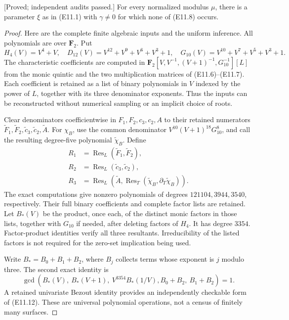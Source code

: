 \begin{lemma}
\label{lem:uniform-eleven-good-parameters-candidate}
\textup{[Proved; independent audits passed.]}
For every normalized modulus $\mu$, there is a parameter $\xi$ as
in (E11.1) with $\gamma\ne0$ for which none of (E11.8) occurs.
\end{lemma}
\begin{proof}
Here are the complete finite algebraic inputs and the uniform inference.
All polynomials are over $\mathbf F_2$. Put
\[
 H_4(V)=V^4+V,\quad D_{12}(V)=V^{12}+V^9+V^6+V^3+1,
 \quad G_{10}(V)=V^{10}+V^7+V^5+V^3+1.
\]
The characteristic coefficients are computed in
$\mathbf F_2[V,V^{-1},(V+1)^{-1},G_{10}^{-1}][L]$ from the monic
quintic and the two multiplication matrices of (E11.6)--(E11.7).
Each coefficient is retained as a list of binary polynomials in $V$
indexed by the power of $L$, together with its three denominator
exponents. Thus the inputs can be reconstructed without numerical
sampling or an implicit choice of roots.

Clear denominators coefficientwise in $F_1,F_2,c_3,c_2,A$ to their
retained numerators $\widetilde F_1,\widetilde F_2,
\widetilde c_3,\widetilde c_2,\widetilde A$.
For $\chi_B$, use the common denominator
$V^{10}(V+1)^{18}G_{10}^8$, and call the resulting degree-five
polynomial $\widetilde\chi_B$. Define
\[
\begin{split}
 R_1&=\operatorname{Res}_L(\widetilde F_1,\widetilde F_2),\\
 R_2&=\operatorname{Res}_L(\widetilde c_3,\widetilde c_2),\\
 R_3&=\operatorname{Res}_L\left(\widetilde A,
       \operatorname{Res}_T(\widetilde\chi_B,
                           \partial_T\widetilde\chi_B)\right).
\end{split}                                                     \tag{E11.11}
\]
The exact computations give nonzero polynomials of degrees
$121104,3944,3540$, respectively. Their full binary coefficients and
complete factor lists are retained. Let $B_*(V)$ be the product, once
each, of the distinct monic factors in those lists, together with
$G_{10}$ if needed, after deleting factors of $H_4$.
It has degree $3354$. Factor-product identities verify all three
resultants. Irreducibility of the listed factors is not required for
the zero-set implication being used.

Write $B_* = B_0+B_1+B_2$, where $B_j$ collects terms whose exponent
is $j$ modulo three. The second exact identity is
\[
 \gcd\left(B_*(V),\ B_*(V+1),\ V^{3354}B_*(1/V),
                  B_0+B_2,\ B_1+B_2\right)=1.                  \tag{E11.12}
\]
A retained univariate Bezout identity provides an independently
checkable form of (E11.12). These are universal polynomial operations,
not a census of finitely many surfaces.


\end{proof}
